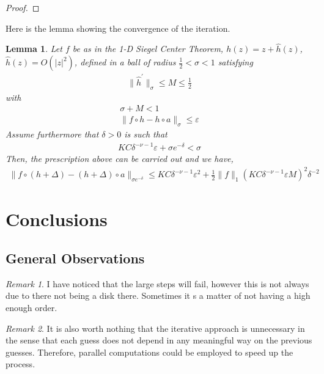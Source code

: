 \documentclass{article}
\theoremstyle{plain}
\newtheorem{lemma}{Lemma}
\theoremstyle{remark}
\newtheorem*{remark}{Remark}
\begin{document}
\begin{proof}

\end{proof}

Here is the lemma showing the convergence of the iteration.

\begin{lemma}\label{lemma-38}
Let $f$ be as in the 1-D Siegel Center Theorem, $h(z) = z + \hat{h}(z)$, $\hat{h}(z) = O(|z|^2)$, defined in a ball of radius $\frac{1}{2} < \sigma < 1$ satisfying
\begin{align*}
\| \hat{h}^\prime \|_\sigma \leq M \leq \frac{1}{2}
\end{align*}
with
\begin{align*}
\sigma + M < 1 \\
\| f \circ h - h \circ a \|_\sigma \leq \varepsilon
\end{align*}
Assume furthermore that $\delta	> 0$ is such that 
\begin{align*}
KC \delta^{-\nu-1}\varepsilon+\sigma e^{-\delta} < \sigma
\end{align*}
Then, the prescription above can be carried out and we have,
\begin{align*}
\| f \circ (h + \Delta) - (h + \Delta)\circ a \|_{\sigma e^{-\delta}} \leq KC \delta^{-\nu-1}\varepsilon^2 + \frac{1}{2} \| f \|_1 (KC \delta^{-\nu-1}\varepsilon M)^2\delta^{-2}
\end{align*}
\end{lemma}

\section{Conclusions}%

\subsection{General Observations}

\begin{remark}
I have noticed that the large steps will fail, however this is not always due to there not being a disk there. Sometimes it s a matter of not having a high enough order. 
\end{remark}

\begin{remark}
It is also worth nothing that the iterative approach is unnecessary in the sense that each guess does not depend in any meaningful way on the previous guesses. 
Therefore, parallel computations could be employed to speed up the process. 
\end{remark}
\end{document}
